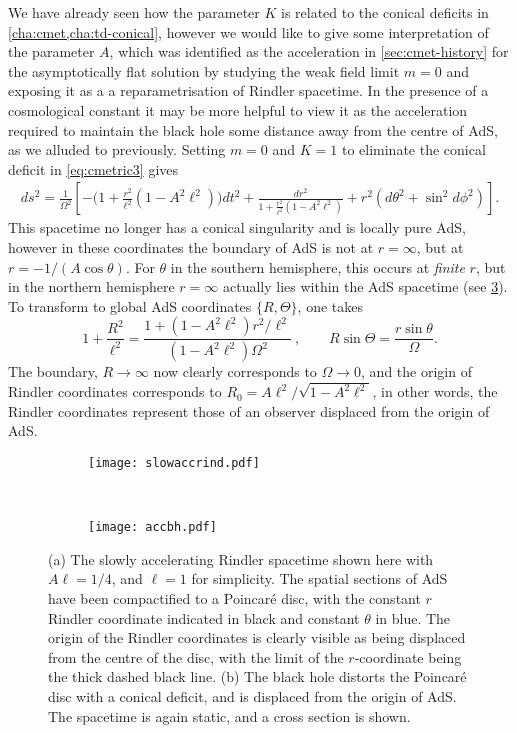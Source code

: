 \documentclass[
twoside,
openright,
frontopenright,
]{dmathesis}
\begin{document}
We have already seen how the parameter $K$ is related to the conical deficits in
\cref{cha:cmet,cha:td-conical}, however we would like to give some
interpretation of the parameter $A$, which was identified as the acceleration in
\cref{sec:cmet-history} for the asymptotically flat solution by studying the
weak field limit $m=0$ and exposing it as a a reparametrisation of Rindler
spacetime. In the presence of a cosmological constant it may be more helpful to
view it as the acceleration required to maintain the black hole some distance
away from the centre of AdS, as we alluded to previously. Setting $m=0$ and
$K=1$ to eliminate the conical deficit in \cref{eq:cmetric3} gives
\begin{align}
ds^2=\frac{1}{\Omega^2}\left[ -
\Big( 1 + \frac{r^2}{\ell^2} (1-A^2 \ell^2) \Big) dt^2
+\frac{dr^2}{1 + \frac{r^2}{\ell^2}(1-A^2\ell^2)} + r^2 ( d\theta^2
+ \sin^2 d\phi^2)\right].
\end{align}
This spacetime no longer has a conical singularity and is locally pure AdS,
however in these coordinates the boundary of AdS is not at $r=\infty$, but at
$r = -1/(A\cos\theta)$. For $\theta$ in the southern hemisphere, this occurs at
\emph{finite} $r$, but in the northern hemisphere $r=\infty$ actually lies
within the AdS spacetime (see \cref{fig:accbh}). To transform to global AdS
coordinates $\{R,\Theta\}$, one takes \cite{Podolsky:2002nk}
\begin{equation}
1 + \frac{R^2}{\ell^2} = \frac{1 + (1-A^2\ell^2)r^2/\ell^2}{(1-A^2\ell^2)\Omega^2}
~,\qquad
R \sin\Theta = \frac{r\sin\theta}{\Omega}.
\end{equation}
The boundary, $R\to\infty$ now clearly corresponds to $\Omega\to 0$, and the
origin of Rindler coordinates corresponds to
$R_0 = A \ell^2/\sqrt{1-A^2\ell^2}$, in other words, the Rindler coordinates
represent those of an observer displaced from the origin of AdS.
\begin{figure}
  \centering
  \begin{subfigure}[b]{0.5\textwidth}
    \texttt{[image: slowaccrind.pdf]}
    \caption{\label{fig:accbha}}
  \end{subfigure}~
  \begin{subfigure}[b]{0.4\textwidth}
    \texttt{[image: accbh.pdf]}
    \caption{\label{fig:accbh}}
  \end{subfigure}
  \caption{\label{fig:accbh}(a) The slowly accelerating Rindler spacetime shown
    here with $A\ell = 1/4$, and $\ell=1$ for simplicity. The spatial sections
    of AdS have been compactified to a Poincar\'e disc, with the constant $r$
    Rindler coordinate indicated in black and constant $\theta$ in blue. The
    origin of the Rindler coordinates is clearly visible as being displaced from
    the centre of the disc, with the limit of the $r$-coordinate being the thick
    dashed black line. (b) The black hole distorts the Poincar\'e disc with a
    conical deficit, and is displaced from the origin of AdS. The spacetime is
    again static, and a cross section is shown.}
\end{figure}
\end{document}
